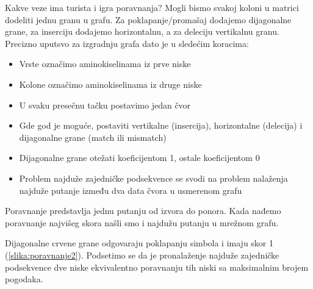 Kakve veze ima turista i igra poravnanja? Mogli bismo svakoj koloni u matrici dodeliti jednu granu u grafu. Za poklapanje/promašaj dodajemo dijagonalne grane, za inserciju dodajemo horizontalnu, a za deleciju vertikalnu granu. Precizno uputsvo za izgradnju grafa dato je u sledećim koracima: 
\begin{itemize}
    \item Vrste označimo aminokiselinama iz prve niske
    \item Kolone označimo aminokiselinama iz druge niske
    \item U svaku presečnu tačku postavimo jedan čvor
    \item Gde god je moguće, postaviti vertikalne (insercija), horizontalne (delecija) i dijagonalne grane (match ili mismatch)
    \item Dijagonalne grane otežati koeficijentom 1, ostale koeficijentom 0
    \item Problem najduže zajedničke podsekvence se svodi na problem nalaženja najduže putanje između dva data čvora u usmerenom grafu
\end{itemize}

Poravnanje predstavlja jednu putanju od izvora do ponora. Kada nađemo poravnanje najvišeg skora našli smo i najdužu putanju u mrežnom grafu.

Dijagonalne crvene grane odgovaraju poklapanju simbola i imaju skor 1 (\ref{slika:poravnanje2}). Podsetimo se da je pronalaženje najduže zajedničke podsekvence dve niske ekvivalentno poravnanju tih niski sa maksimalnim brojem pogodaka. 

